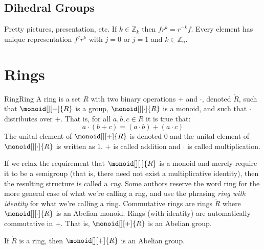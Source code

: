 \documentclass{article}                                                        %
\begin{document}
        \subsection{Dihedral Groups}
            Pretty pictures, presentation, etc. If $k\in\mathbb{Z}_{k}$ then
            $fr^{k}=r^{\minus{k}}f$. Every element has unique representation
            $f^{j}r^{k}$ with $j=0$ or $j=1$ and $k\in\mathbb{Z}_{n}$.
    \section{Rings}
        \begin{fdefinition}{Ring}{Ring}
            A ring is a set $R$ with two binary operations $+$ and $\cdot$,
            denoted $\ring{R}$, such that $\monoid[][+]{R}$ is a group,
            $\monoid[][\cdot]{R}$ is a monoid, and such that $\cdot$ distributes
            over $+$. That is, for all $a,b,c\in{R}$ it is true that:
            \begin{equation*}
                a\cdot(b+c)=(a\cdot{b})+(a\cdot{c})
            \end{equation*}
            The unital element of $\monoid[][+]{R}$ is denoted $0$ and the
            unital element of $\monoid[][\cdot]{R}$ is written as $1$. $+$ is
            called addition and $\cdot$ is called multiplication.
        \end{fdefinition}
        If we relax the requirement that $\monoid[][\cdot]{R}$ is a monoid and
        merely require it to be a semigroup (that is, there need not exist a
        multiplicative identity), then the resulting structure is called a
        \textit{rng}. Some authors reserve the word ring for the more general
        case of what we're calling a rng, and use the phrasing
        \textit{ring with identity} for what we're calling a ring. Commutative
        rings are rings $\ring{R}$ where $\monoid[][\cdot]{R}$ is an Abelian
        monoid. Rings (with identity) are automatically commutative in $+$. That
        is, $\monoid[][+]{R}$ is an Abelian group.
        \begin{theorem}
            \label{thm:Ring_Add_is_Commutative}%
            If $\ring{R}$ is a ring, then $\monoid[][+]{R}$ is an Abelian group.
        \end{theorem}
\end{document}
